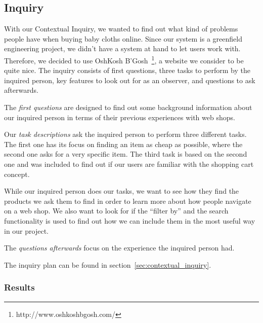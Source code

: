 \subsection{Inquiry}
With our Contextual Inquiry, we wanted to find out what kind of problems people have when buying baby cloths online. Since our system is a greenfield engineering project, we didn't have a system at hand to let users work with. Therefore, we decided to use OshKosh B'Gosh~\footnote{http://www.oshkoshbgosh.com/}, a website we consider to be quite nice.
The inquiry consists of first questions, three tasks to perform by the inquired person, key features to look out for as an observer, and questions to ask afterwards.

The \textit{first questions} are designed to find out some background information about our inquired person in terms of their previous experiences with web shops. 

Our \textit{task descriptions} ask the inquired person to perform three different tasks. The first one has its focus on finding an item as cheap as possible, where the second one asks for a very specific item. The third task is based on the second one and was included to find out if our users are familiar with the shopping cart concept. 

While our inquired person does our tasks, we want to see how they find the products we ask them to find in order to learn more about how people navigate on a web shop. We also want to look for if the ``filter by'' and the search functionality is used to find out how we can include them in the most useful way in our project. 

The \textit{questions afterwards} focus on the experience the inquired person had.

The inquiry plan can be found in section~\ref{sec:contextual_inquiry}.

\subsubsection{Results}


